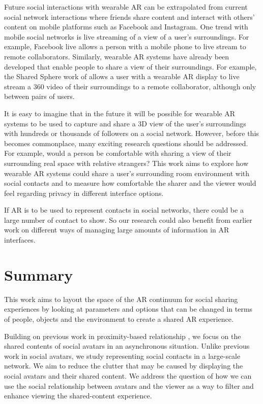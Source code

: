 Future social interactions with wearable AR can be extrapolated from current social network interactions where friends share content and interact with others' content on mobile platforms such as Facebook and Instagram. One trend with mobile social networks is live streaming of a view of a user’s surroundings. For example, Facebook live allows a person with a mobile phone to live stream to remote collaborators. Similarly, wearable AR systems have already been developed that enable people to share a view of their surroundings. For example, the Shared Sphere work of \cite{lee2017mixed} allows a user with a wearable AR display to live stream a 360 video of their surroundings to a remote collaborator, although only between pairs of users. 

It is easy to imagine that in the future it will be possible for wearable AR systems to be used to capture and share a 3D view of the user's surroundings with hundreds or thousands of followers on a social network. However, before this becomes commonplace, many exciting research questions should be addressed. For example, would a person be comfortable with sharing a view of their surrounding real space with relative strangers? This work aims to explore how wearable AR systems could share a user’s surrounding room environment with social contacts and to measure how comfortable the sharer and the viewer would feel regarding privacy in different interface options. 

If AR is to be used to represent contacts in social networks, there could be a large number of contact to show. So our research could also benefit from earlier work on different ways of managing large amounts of information in AR interfaces.


\section{Summary}

This work aims to layout the space of the AR continuum for social sharing experiences by looking at parameters and options that can be changed in terms of people, objects and the environment to create a shared AR experience. 

Building on previous work in proximity-based relationship \cite{Sousa2016}, we focus on the shared contents of social avatars in an asynchronous situation. Unlike previous work in social avatars, we study representing social contacts in a large-scale network. We aim to reduce the clutter that may be caused by displaying the social avatars and their shared content. We address the question of how we can use the social relationship between avatars and the viewer as a way to filter and enhance viewing the shared-content experience. 

